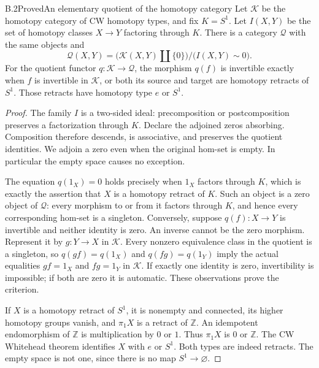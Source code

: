 \begin{claim}{B.2}{Proved}{An elementary quotient of the homotopy category}
Let $\mathscr K$ be the homotopy category of CW homotopy types, and fix
$K=S^1$. Let $I(X,Y)$ be the set of homotopy classes $X\to Y$ factoring
through $K$. There is a category $\mathscr Q$ with the same objects and
\[
 \mathscr Q(X,Y)=\bigl(\mathscr K(X,Y)\amalg\{0\}\bigr)/
       \bigl(I(X,Y)\sim0\bigr).
\]
For the quotient functor $q:\mathscr K\to\mathscr Q$, the morphism $q(f)$
is invertible exactly when $f$ is invertible in $\mathscr K$, or both its
source and target are homotopy retracts of $S^1$. Those retracts have
homotopy type $e$ or $S^1$.
\end{claim}
\begin{proof}
The family $I$ is a two-sided ideal: precomposition or postcomposition
preserves a factorization through $K$. Declare the adjoined zeros
absorbing. Composition therefore descends, is associative, and preserves
the quotient identities. We adjoin a zero even when the original hom-set
is empty. In particular the empty space causes no exception.

The equation $q(1_X)=0$ holds precisely when $1_X$ factors through $K$,
which is exactly the assertion that $X$ is a homotopy retract of $K$.
Such an object is a zero object of $\mathscr Q$: every morphism to or from
it factors through $K$, and hence every corresponding hom-set is a
singleton. Conversely, suppose $q(f):X\to Y$ is invertible and neither
identity is zero. An inverse cannot be the zero morphism. Represent it by
$g:Y\to X$ in $\mathscr K$. Every nonzero equivalence class in the
quotient is a singleton, so $q(gf)=q(1_X)$ and $q(fg)=q(1_Y)$ imply the
actual equalities $gf=1_X$ and $fg=1_Y$ in $\mathscr K$. If exactly one
identity is zero, invertibility is impossible; if both are zero it is
automatic. These observations prove the criterion.

If $X$ is a homotopy retract of $S^1$, it is nonempty and connected, its
higher homotopy groups vanish, and $\pi _1X$ is a retract of $\mathbb Z$.
An idempotent endomorphism of $\mathbb Z$ is multiplication by $0$ or $1$.
Thus $\pi _1X$ is $0$ or $\mathbb Z$. The CW Whitehead theorem identifies
$X$ with $e$ or $S^1$. Both types are indeed retracts. The empty space is
not one, since there is no map $S^1\to\varnothing$.
\end{proof}

